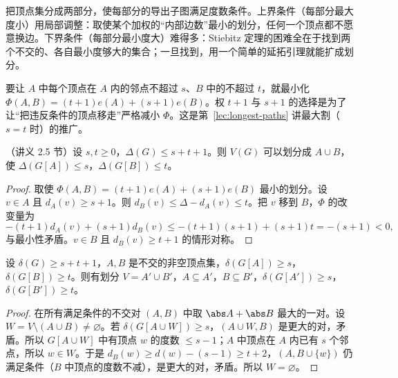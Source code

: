 \label{lec:partitions}

把顶点集分成两部分，使每部分的导出子图满足度数条件。上界条件（每部分最大度小）用局部调整：取使某个加权的“内部边数”最小的划分，任何一个顶点都不愿意换边。下界条件（每部分最小度大）难得多：Stiebitz 定理的困难全在于找到两个不交的、各自最小度够大的集合；一旦找到，用一个简单的延拓引理就能扩成划分。


要让 $A$ 中每个顶点在 $A$ 内的邻点不超过 $s$、$B$ 中的不超过 $t$，就最小化 $\Phi(A,B)=(t+1)e(A)+(s+1)e(B)$。权 $t+1$ 与 $s+1$ 的选择是为了让“把违反条件的顶点移走”严格减小 $\Phi$。这是第~\ref{lec:longest-paths} 讲最大割（$s=t$ 时）的推广。

\begin{theorem}[Lovász]\label{thm:partitions:lovasz}
（讲义 2.5 节）设 $s,t\geqslant0$，$\Delta(G)\leqslant s+t+1$。则 $V(G)$ 可以划分成 $A\cup B$，使 $\Delta(G[A])\leqslant s$，$\Delta(G[B])\leqslant t$。
\end{theorem}
\begin{proof}
取使 $\Phi(A,B)=(t+1)e(A)+(s+1)e(B)$ 最小的划分。设 $v\in A$ 且 $d_A(v)\geqslant s+1$。则 $d_B(v)\leqslant\Delta-d_A(v)\leqslant t$。把 $v$ 移到 $B$，$\Phi$ 的改变量为
\[
-(t+1)d_A(v)+(s+1)d_B(v)\leqslant-(t+1)(s+1)+(s+1)t=-(s+1)<0,
\]
与最小性矛盾。$v\in B$ 且 $d_B(v)\geqslant t+1$ 的情形对称。
\end{proof}


\begin{lemma}[延拓引理]\label{lem:partitions:extend}
设 $\delta(G)\geqslant s+t+1$，$A,B$ 是不交的非空顶点集，$\delta(G[A])\geqslant s$，$\delta(G[B])\geqslant t$。则有划分 $V=A'\cup B'$，$A\subseteq A'$，$B\subseteq B'$，$\delta(G[A'])\geqslant s$，$\delta(G[B'])\geqslant t$。
\end{lemma}
\begin{proof}
在所有满足条件的不交对 $(A,B)$ 中取 $\abs A+\abs B$ 最大的一对。设 $W=V\setminus(A\cup B)\neq\varnothing$。若 $\delta(G[A\cup W])\geqslant s$，$(A\cup W,B)$ 是更大的对，矛盾。所以 $G[A\cup W]$ 中有顶点 $w$ 的度数 $\leqslant s-1$；$A$ 中顶点在 $A$ 内已有 $s$ 个邻点，所以 $w\in W$。于是 $d_B(w)\geqslant d(w)-(s-1)\geqslant t+2$，$(A,B\cup\{w\})$ 仍满足条件（$B$ 中顶点的度数不减），是更大的对，矛盾。所以 $W=\varnothing$。
\end{proof}

